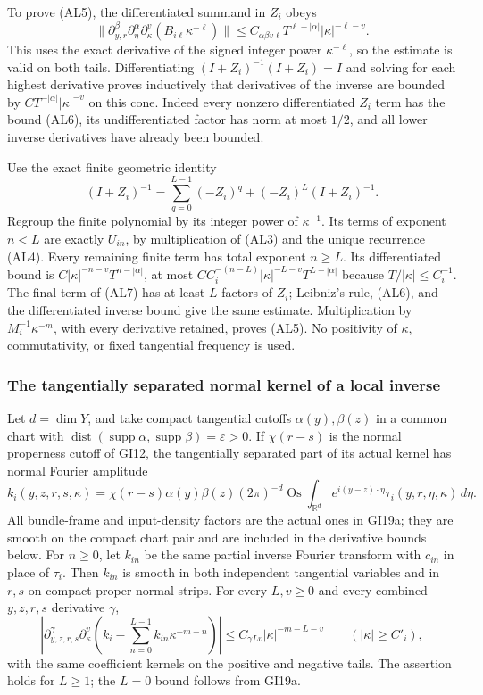 \documentclass[
  11pt,
]{article}
\begin{document}
To prove (AL5), the differentiated summand in \(Z_i\) obeys \[
 \|\partial_{y,r}^{\beta}\partial_\eta^\alpha
 \partial_\kappa^v(B_{i\ell}\kappa^{-\ell})\|
 \leq C_{\alpha\beta v\ell}T^{\ell-|\alpha|}
 |\kappa|^{-\ell-v}.
 \tag{AL6}
\] This uses the exact derivative of the signed integer power
\(\kappa^{-\ell}\), so the estimate is valid on both tails.
Differentiating \((I+Z_i)^{-1}(I+Z_i)=I\) and solving for each highest
derivative proves inductively that derivatives of the inverse are
bounded by \(C T^{-|\alpha|}|\kappa|^{-v}\) on this cone. Indeed every
nonzero differentiated \(Z_i\) term has the bound (AL6), its
undifferentiated factor has norm at most \(1/2\), and all lower inverse
derivatives have already been bounded.

Use the exact finite geometric identity \[
 (I+Z_i)^{-1}
 =\sum_{q=0}^{L-1}(-Z_i)^q
   +(-Z_i)^L(I+Z_i)^{-1}.
 \tag{AL7}
\] Regroup the finite polynomial by its integer power of
\(\kappa^{-1}\). Its terms of exponent \(n<L\) are exactly \(U_{in}\),
by multiplication of (AL3) and the unique recurrence (AL4). Every
remaining finite term has total exponent \(n\geq L\). Its differentiated
bound is \(C|\kappa|^{-n-v}T^{n-|\alpha|}\), at most
\(C C_i^{-(n-L)}|\kappa|^{-L-v}T^{L-|\alpha|}\) because
\(T/|\kappa|\leq C_i^{-1}\). The final term of (AL7) has at least \(L\)
factors of \(Z_i\); Leibniz's rule, (AL6), and the differentiated
inverse bound give the same estimate. Multiplication by
\(M_i^{-1}\kappa^{-m}\), with every derivative retained, proves (AL5).
No positivity of \(\kappa\), commutativity, or fixed tangential
frequency is used.

\subsubsection{The tangentially separated normal kernel of a local
inverse}\label{the-tangentially-separated-normal-kernel-of-a-local-inverse}

Let \(d=\dim Y\), and take compact tangential cutoffs
\(\alpha(y),\beta(z)\) in a common chart with
\(\operatorname{dist}(\operatorname{supp}\alpha,\operatorname{supp}\beta)=\varepsilon>0\).
If \(\chi(r-s)\) is the normal properness cutoff of GI12, the
tangentially separated part of its actual kernel has normal Fourier
amplitude \[
 k_i(y,z,r,s,\kappa)
 =\chi(r-s)\alpha(y)\beta(z)(2\pi)^{-d}
 \operatorname{Os}\!\int_{\mathbb R^d}
 e^{i(y-z)\cdot\eta}\tau_i(y,r,\eta,\kappa)\,d\eta .
 \tag{AL8}
\] All bundle-frame and input-density factors are the actual ones in
GI19a; they are smooth on the compact chart pair and are included in the
derivative bounds below. For \(n\geq0\), let \(k_{in}\) be the same
partial inverse Fourier transform with \(c_{in}\) in place of
\(\tau_i\). Then \(k_{in}\) is smooth in both independent tangential
variables and in \(r,s\) on compact proper normal strips. For every
\(L,v\geq0\) and every combined \(y,z,r,s\) derivative \(\gamma\), \[
 \left|\partial_{y,z,r,s}^{\gamma}\partial_\kappa^v
 \left(k_i-\sum_{n=0}^{L-1}k_{in}\kappa^{-m-n}\right)\right|
 \leq C_{\gamma Lv}|\kappa|^{-m-L-v}
 \qquad(|\kappa|\geq C'_{i}),
 \tag{AL9}
\] with the same coefficient kernels on the positive and negative tails.
The assertion holds for \(L\geq1\); the \(L=0\) bound follows from
GI19a.
\end{document}
